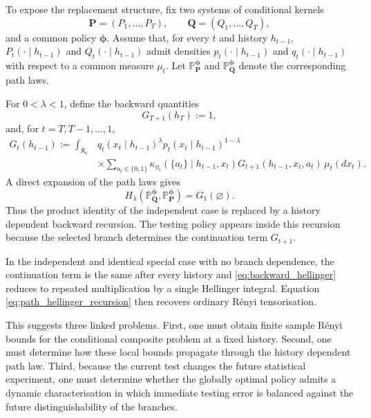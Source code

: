 \documentclass[11pt]{article}
\newcommand{\Prob}{\mathbb{P}}
\begin{document}
To expose the replacement structure, fix two systems of conditional kernels
\[
\mathbf{P}=(P_1,\ldots,P_T),
\qquad
\mathbf{Q}=(Q_1,\ldots,Q_T),
\]
and a common policy $\boldsymbol{\phi}$. Assume that, for every $t$ and history $h_{t-1}$, $P_t(\cdot\mid h_{t-1})$ and $Q_t(\cdot\mid h_{t-1})$ admit densities $p_t(\cdot\mid h_{t-1})$ and $q_t(\cdot\mid h_{t-1})$ with respect to a common measure $\mu_t$. Let $\Prob_{\mathbf{P}}^{\boldsymbol{\phi}}$ and $\Prob_{\mathbf{Q}}^{\boldsymbol{\phi}}$ denote the corresponding path laws.

For $0<\lambda<1$, define the backward quantities
\begin{equation}
G_{T+1}(h_T):=1,
\label{eq:backward_terminal}
\end{equation}
and, for $t=T,T-1,\ldots,1$,
\begin{align}
G_t(h_{t-1})
:=
\int_{\mathsf{X}_t}
&q_t(x_t\mid h_{t-1})^{\lambda}
 p_t(x_t\mid h_{t-1})^{1-\lambda}
\nonumber\\
&\times
\sum_{a_t\in\{0,1\}}
\kappa_{\phi_t}(\{a_t\}\mid h_{t-1},x_t)
G_{t+1}(h_{t-1},x_t,a_t)
\,\mu_t(dx_t).
\label{eq:backward_hellinger}
\end{align}
A direct expansion of the path laws gives
\begin{equation}
H_{\lambda}\!\left(
\Prob_{\mathbf{Q}}^{\boldsymbol{\phi}},
\Prob_{\mathbf{P}}^{\boldsymbol{\phi}}
\right)
=
G_1(\varnothing).
\label{eq:path_hellinger_recursion}
\end{equation}
Thus the product identity of the independent case is replaced by a history dependent backward recursion. The testing policy appears inside this recursion because the selected branch determines the continuation term $G_{t+1}$.

In the independent and identical special case with no branch dependence, the continuation term is the same after every history and \eqref{eq:backward_hellinger} reduces to repeated multiplication by a single Hellinger integral. Equation \eqref{eq:path_hellinger_recursion} then recovers ordinary R\'enyi tensorisation.

This suggests three linked problems. First, one must obtain finite sample R\'enyi bounds for the conditional composite problem at a fixed history. Second, one must determine how these local bounds propagate through the history dependent path law. Third, because the current test changes the future statistical experiment, one must determine whether the globally optimal policy admits a dynamic characterisation in which immediate testing error is balanced against the future distinguishability of the branches.
\end{document}
